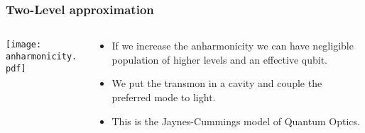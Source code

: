 \documentclass{beamer}
\begin{document}
\begin{frame}

    \frametitle{Two-Level approximation}

    \begin{columns}[c]

        \begin{column}{0.5\linewidth}

            \begin{block}{}
    \vspace{-.7cm}
    \texttt{[image: anharmonicity.pdf]}
            \end{block}

        \end{column}
        \begin{column}{0.5\linewidth}

            \begin{itemize}
                \item If we increase the anharmonicity we can 
                        have negligible population of higher levels 
                        and an effective qubit.
                \item We put the transmon in a cavity and couple 
                        the preferred mode to light.
                \item This is the Jaynes-Cummings model of 
                        Quantum Optics. 
            \end{itemize}

        \end{column}
    \end{columns}

\end{frame}
\end{document}
